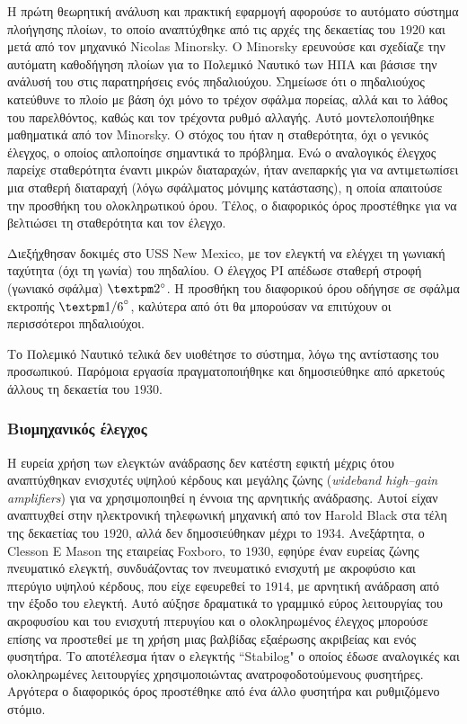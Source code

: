 Η πρώτη θεωρητική ανάλυση και πρακτική εφαρμογή αφορούσε το αυτόματο σύστημα πλοήγησης πλοίων, το οποίο αναπτύχθηκε από τις αρχές της δεκαετίας του $1920$ και μετά από τον μηχανικό Nicolas Minorsky.
Ο Minorsky ερευνούσε και σχεδίαζε την αυτόματη καθοδήγηση πλοίων για το Πολεμικό Ναυτικό των ΗΠΑ και βάσισε την ανάλυσή του στις παρατηρήσεις ενός πηδαλιούχου. Σημείωσε ότι ο πηδαλιούχος κατεύθυνε το πλοίο με βάση όχι μόνο το τρέχον σφάλμα πορείας, αλλά και το λάθος του παρελθόντος, καθώς και τον τρέχοντα ρυθμό αλλαγής.
Αυτό μοντελοποιήθηκε μαθηματικά από τον Minorsky.
Ο στόχος του ήταν η σταθερότητα, όχι ο γενικός έλεγχος, ο οποίος απλοποίησε σημαντικά το πρόβλημα. Ενώ ο αναλογικός έλεγχος παρείχε σταθερότητα έναντι μικρών διαταραχών, ήταν ανεπαρκής για να αντιμετωπίσει μια σταθερή διαταραχή (λόγω σφάλματος μόνιμης κατάστασης), η οποία απαιτούσε την προσθήκη του ολοκληρωτικού όρου. Τέλος, ο διαφορικός όρος προστέθηκε για να βελτιώσει τη σταθερότητα και τον έλεγχο.

Διεξήχθησαν δοκιμές στο USS New Mexico, με τον ελεγκτή να ελέγχει τη γωνιακή ταχύτητα (όχι τη γωνία) του πηδαλίου. Ο έλεγχος PI απέδωσε σταθερή στροφή (γωνιακό σφάλμα) $±2\degree$. Η προσθήκη του διαφορικού όρου οδήγησε σε σφάλμα εκτροπής $±{1/6}\degree$, καλύτερα από ότι θα μπορούσαν να επιτύχουν οι περισσότεροι πηδαλιούχοι.

Το Πολεμικό Ναυτικό τελικά δεν υιοθέτησε το σύστημα, λόγω της αντίστασης του προσωπικού. Παρόμοια εργασία πραγματοποιήθηκε και δημοσιεύθηκε από αρκετούς άλλους τη δεκαετία του $1930$.

\subsubsection{Βιομηχανικός έλεγχος}
Η ευρεία χρήση των ελεγκτών ανάδρασης δεν κατέστη εφικτή μέχρις ότου αναπτύχθηκαν ενισχυτές υψηλού κέρδους και μεγάλης ζώνης (\emph{wideband high--gain amplifiers}) για να χρησιμοποιηθεί η έννοια της αρνητικής ανάδρασης. Αυτοί είχαν αναπτυχθεί στην ηλεκτρονική τηλεφωνική μηχανική από τον Harold Black στα τέλη της δεκαετίας του $1920$, αλλά δεν δημοσιεύθηκαν μέχρι το $1934$.
Ανεξάρτητα, ο Clesson E Mason της εταιρείας Foxboro, το $1930$, εφηύρε έναν ευρείας ζώνης πνευματικό ελεγκτή, συνδυάζοντας τον πνευματικό ενισχυτή με ακροφύσιο και πτερύγιο υψηλού κέρδους, που είχε εφευρεθεί το $1914$, με αρνητική ανάδραση από την έξοδο του ελεγκτή. Αυτό αύξησε δραματικά το γραμμικό εύρος λειτουργίας του ακροφυσίου και του ενισχυτή πτερυγίου και ο ολοκληρωμένος έλεγχος μπορούσε επίσης να προστεθεί με τη χρήση μιας βαλβίδας εξαέρωσης ακριβείας και ενός φυσητήρα. Το αποτέλεσμα ήταν ο ελεγκτής ``Stabilog" ο οποίος έδωσε αναλογικές και ολοκληρωμένες λειτουργίες χρησιμοποιώντας ανατροφοδοτούμενους φυσητήρες.
Αργότερα ο διαφορικός όρος προστέθηκε από ένα άλλο φυσητήρα και ρυθμιζόμενο στόμιο.

